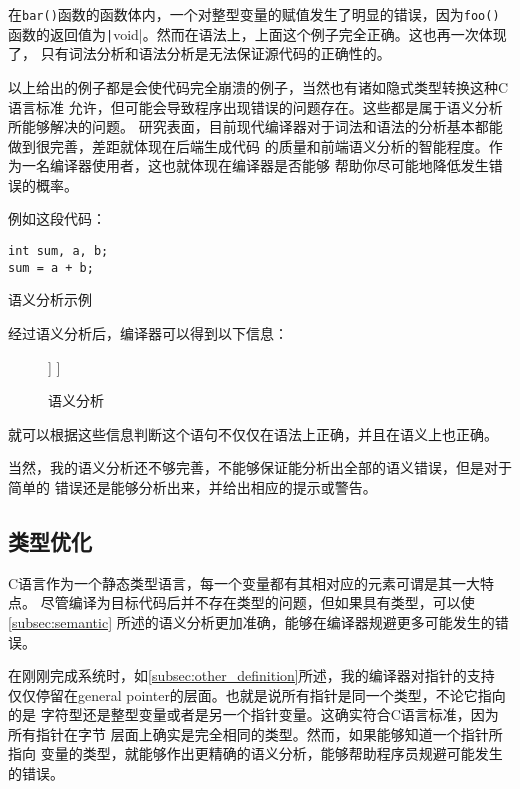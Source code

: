 在{\tt bar()}函数的函数体内，一个对整型变量的赋值发生了明显的错误，因为{\tt foo()}
函数的返回值为\texttt|void|。然而在语法上，上面这个例子完全正确。这也再一次体现了，
只有词法分析和语法分析是无法保证源代码的正确性的。

以上给出的例子都是会使代码完全崩溃的例子，当然也有诸如隐式类型转换这种C语言标准
允许，但可能会导致程序出现错误的问题存在。这些都是属于语义分析所能够解决的问题。
研究表面，目前现代编译器对于词法和语法的分析基本都能做到很完善，差距就体现在后端生成代码
的质量和前端语义分析的智能程度。作为一名编译器使用者，这也就体现在编译器是否能够
帮助你尽可能地降低发生错误的概率。

例如这段代码：
\begin{listing}[hbt]
\begin{verbatim}
int sum, a, b;
sum = a + b;
\end{verbatim}
\caption{语义分析示例}
\end{listing}

经过语义分析后，编译器可以得到以下信息：

\begin{figure}[hbt]
	\centering
	\begin{forest}
		[
			{=}
				[{number\\[-2ex]\scriptsize sum},align=center]
				[
					{+}
						[{number\\[-2ex]\scriptsize a},align=center]
						[{number\\[-2ex]\scriptsize b},align=center]
				]
		]
	\end{forest}
	\caption{语义分析}
\end{figure}

就可以根据这些信息判断这个语句不仅仅在语法上正确，并且在语义上也正确。

当然，我的语义分析还不够完善，不能够保证能分析出全部的语义错误，但是对于简单的
错误还是能够分析出来，并给出相应的提示或警告。

\subsection{类型优化}

C语言作为一个静态类型语言，每一个变量都有其相对应的元素可谓是其一大特点。
尽管编译为目标代码后并不存在类型的问题，但如果具有类型，可以使\autoref{subsec:semantic}
所述的语义分析更加准确，能够在编译器规避更多可能发生的错误。

在刚刚完成系统时，如\autoref{subsec:other_definition}所述，我的编译器对指针的支持
仅仅停留在general pointer的层面。也就是说所有指针是同一个类型，不论它指向的是
字符型还是整型变量或者是另一个指针变量。这确实符合C语言标准，因为所有指针在字节
层面上确实是完全相同的类型\cite{kernighan2006c}。然而，如果能够知道一个指针所指向
变量的类型，就能够作出更精确的语义分析，能够帮助程序员规避可能发生的错误。

